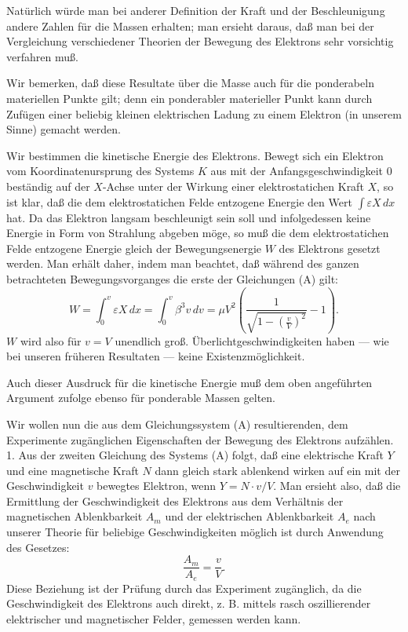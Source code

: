 \documentclass[17pt]{webarticle}       %
\begin{document}
Natürlich würde man bei anderer Definition der Kraft und der Beschleunigung andere Zahlen für die Massen erhalten; man ersieht daraus, daß man bei der Vergleichung verschiedener Theorien der Bewegung des Elektrons sehr vorsichtig verfahren muß.

Wir bemerken, daß diese Resultate über die Masse auch für die ponderabeln materiellen Punkte gilt; denn ein ponderabler materieller Punkt kann durch Zufügen einer beliebig kleinen elektrischen Ladung zu einem Elektron (in unserem Sinne) gemacht werden.

Wir bestimmen die kinetische Energie des Elektrons. Bewegt sich ein Elektron vom Koordinatenursprung des Systems \( K \) aus mit der Anfangsgeschwindigkeit 0 beständig auf der \(X\)-Achse unter der Wirkung einer elektrostatichen Kraft \(X\), so ist klar, daß die dem elektrostatichen Felde entzogene Energie den Wert \(\int \varepsilon X \, dx\) hat. Da das Elektron langsam beschleunigt sein soll und infolgedessen keine Energie in Form von Strahlung abgeben möge, so muß die dem elektrostatichen Felde entzogene Energie gleich der Bewegungsenergie \(W\) des Elektrons gesetzt werden. Man erhält daher, indem man beachtet, daß während des ganzen betrachteten Bewegungsvorganges die erste der Gleichungen (A) gilt:
\[
W = \int_0^v \varepsilon X \, dx = \int_0^v \beta^3 v \, dv = \mu V^2 \left( \frac{1}{\sqrt{1 - \left( \frac{v}{V} \right)^2}} - 1 \right).
\]
\(W\) wird also für \(v = V\) unendlich groß. Überlichtgeschwindigkeiten haben — wie bei unseren früheren Resultaten — keine Existenzmöglichkeit.

Auch dieser Ausdruck für die kinetische Energie muß dem oben angeführten Argument zufolge ebenso für ponderable Massen gelten.

Wir wollen nun die aus dem Gleichungssystem (A) resultierenden, dem Experimente zugänglichen Eigenschaften der Bewegung des Elektrons aufzählen.
1. Aus der zweiten Gleichung des Systems (A) folgt, daß eine elektrische Kraft \(Y\) und eine magnetische Kraft \(N\) dann gleich stark ablenkend wirken auf ein mit der Geschwindigkeit \(v\) bewegtes Elektron, wenn \(Y = N \cdot v / V\). Man ersieht also, daß die Ermittlung der Geschwindigkeit des Elektrons aus dem Verhältnis der magnetischen Ablenkbarkeit \(A_m\) und der elektrischen Ablenkbarkeit \(A_e\) nach unserer Theorie für beliebige Geschwindigkeiten möglich ist durch Anwendung des Gesetzes:
\[
\frac{A_m}{A_e} = \frac{v}{V} .
\]
Diese Beziehung ist der Prüfung durch das Experiment zugänglich, da die Geschwindigkeit des Elektrons auch direkt, z. B. mittels rasch oszillierender elektrischer und magnetischer Felder, gemessen werden kann.
\end{document}
